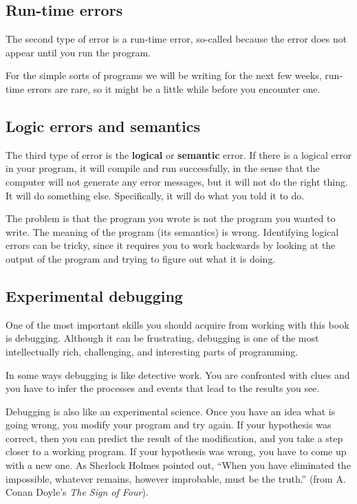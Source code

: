 \subsection{Run-time errors}
\label{run-time}

The second type of error is a run-time error, so-called because
the error does not appear until you run the program.

For the simple sorts of programs we will be writing for the
next few weeks, run-time errors are rare, so it might be a little
while before you encounter one.


\subsection{Logic errors and semantics}

The third type of error is the {\bf logical} or {\bf semantic}
error.  If there is a logical error in your program, it will
compile and run successfully, in the sense that the computer
will not generate any error messages, but it will not do the
right thing.  It will do something else.  Specifically, it will
do what you told it to do.

The problem is that the program you wrote is not the program
you wanted to write.  The meaning of the program (its semantics)
is wrong.  Identifying logical errors can be tricky, since
it requires you to work backwards by looking at the output
of the program and trying to figure out what it is doing.

\subsection{Experimental debugging}

One of the most important skills you should acquire from working with
this book is debugging.  Although it can be frustrating, debugging is
one of the most intellectually rich, challenging, and interesting
parts of programming.

In some ways debugging is like detective work.  You are
confronted with clues and you have to infer the processes
and events that lead to the results you see.

Debugging is also like an experimental science.  Once you have an idea
what is going wrong, you modify your program and try again.  If your
hypothesis was correct, then you can predict the result of the
modification, and you take a step closer to a working program.  If
your hypothesis was wrong, you have to come up with a new one.  As
Sherlock Holmes pointed out, ``When you have eliminated the
impossible, whatever remains, however improbable, must be the truth.''
(from A. Conan Doyle's {\em The Sign of Four}).

